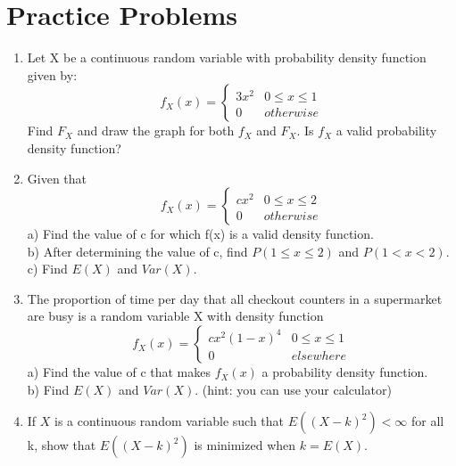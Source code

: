 \documentclass[11pt]{article}
\begin{document}
\section{Practice Problems}
\begin{enumerate}
  \item Let X be a continuous random variable with probability density function given by:
  \begin{equation*}
    f_X(x) = 
    \begin{cases}
      3x^2 & 0 \leq x \leq 1 \\
      0 & otherwise
    \end{cases}
  \end{equation*}
  Find $F_X$ and draw the graph for both $f_X$ and $F_X$. Is $f_X$ a valid probability density function?
  \item Given that 
  \begin{equation*}
    f_X(x) = \begin{cases}
      cx^2 & 0 \leq x \leq 2 \\
      0 & otherwise
    \end{cases}
  \end{equation*}
   a) Find the value of c for which f(x) is a valid density function. \\
   b) After determining the value of c, find $P(1 \leq x \leq 2)$ and $P(1 < x < 2)$. \\
   c) Find $E(X)$ and $Var(X)$. 
  \item The proportion of time per day that all checkout counters in a supermarket are busy is a random variable X with density function
  \begin{equation*}
    f_X(x) = 
    \begin{cases}
      cx^2(1-x)^4 & 0 \leq x \leq 1 \\
      0 & elsewhere
    \end{cases}
  \end{equation*}
  a) Find the value of c that makes $f_X(x)$ a probability density function. \\
  b) Find $E(X)$ and $Var(X)$. (hint: you can use your calculator)
  \item If $X$ is a continuous random variable such that $E((X - k)^2) < \infty$ for all k, show that $E((X - k)^2)$ is minimized when $k = E(X)$.
\end{enumerate}
\end{document}
